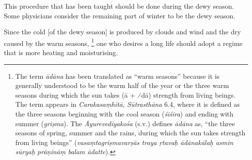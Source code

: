 \begin{translation}
\item[36] 
This procedure %
that has been taught should be done during the dewy season. %
Some physicians consider the remaining part of winter to be the dewy season. 

\item[37] %
Since the cold [of the dewy season] is produced by clouds and wind and the dry caused by the warm seasons,%
	\footnote{The term \emph{ādāna} has been translated as ``warm seasons'' because it is generally understood to be the warm half of the year or the three warm seasons during which the sun takes (ā + ⁄{dā}) strength from living beings. The term appears in \emph{Carakasaṃhitā, Sūtrasthāna} 6.4, where it is defined as the three seasons beginning with the cool season (\emph{śiśira}) and ending with summer (\emph{griṣma}). The  \emph{Āyurevedīyakośa} (s.v.) defines \emph{ādāna} as, ``the three seasons of spring, summer and the rains, during which the sun takes strength from living beings''  (\emph{vasaṃtagrīṣmavarṣās traya ṛtavaḥ ādānakālaḥ asmin sūryaḥ prāṇināṃ balam ādatte}).}
one who desires a long life should adopt a regime that is more heating and moisturising. 	


\end{translation}
